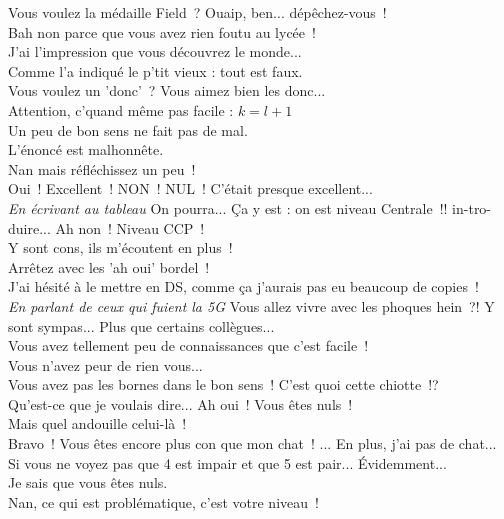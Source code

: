 \documentclass[french, a4paper, openany]{book}
\begin{document}
	\noindent \og Vous voulez la médaille Field~? Ouaip, ben... dépêchez-vous~! \fg \\
	\og Bah non parce que vous avez rien foutu au lycée~! \fg \\
	\og J'ai l'impression que vous découvrez le monde... \fg \\
	\og Comme l'a indiqué le p'tit vieux : tout est faux. \fg \\
	\og Vous voulez un 'donc'~? Vous aimez bien les donc... \fg \\
	\og Attention, c'quand même pas facile : $k = l+ 1$ \fg \\
	\og Un peu de bon sens ne fait pas de mal. \fg \\
	\og L'énoncé est malhonnête. \fg \\
	\og Nan mais réfléchissez un peu~! \fg \\
	\og Oui~! Excellent~! NON~! NUL~! C'était presque excellent... \fg \\
	\emph{En écrivant au tableau} \og On pourra... Ça y est : on est niveau Centrale~!! in-tro-duire... Ah non~! Niveau CCP~! \fg \\
	\og Y sont cons, ils m'écoutent en plus~! \fg \\
	\og Arrêtez avec les 'ah oui' bordel~! \fg \\
	\og J'ai hésité à le mettre en DS, comme ça j'aurais pas eu beaucoup de copies~!\fg \\
	\emph{En parlant de ceux qui fuient la 5G} \og Vous allez vivre avec les phoques hein~?! Y sont sympas... Plus que certains collègues... \fg \\
	\og Vous avez tellement peu de connaissances que c'est facile~! \fg \\
	\og Vous n'avez peur de rien vous... \fg \\	
	\og Vous avez pas les bornes dans le bon sens~! C'est quoi cette chiotte~!? \fg \\
	\og Qu'est-ce que je voulais dire... Ah oui~! Vous êtes nuls~! \fg \\
	\og Mais quel andouille celui-là~! \fg \\
	\og Bravo~! Vous êtes encore plus con que mon chat~! ... En plus, j'ai pas de chat... \fg \\
	\og Si vous ne voyez pas que 4 est impair et que 5 est pair... Évidemment... \fg \\
	\og Je sais que vous êtes nuls. \fg \\
	\og Nan, ce qui est problématique, c'est votre niveau~! \fg \\
\end{document}
